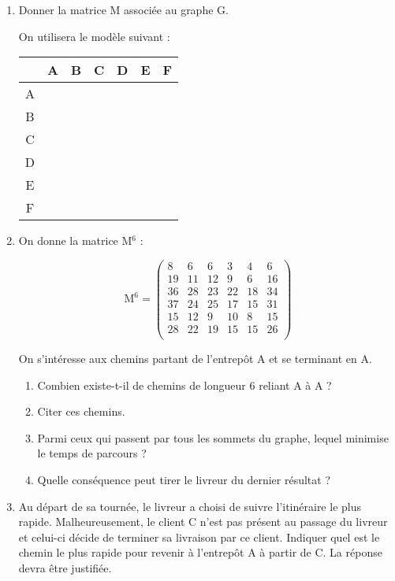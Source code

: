 \documentclass[]{prof}
\begin{document}
\begin{enumerate} 
\item Donner la matrice M associée au graphe G.

On utilisera le modèle suivant :

\begin{center}
    \begin{tabular}{|*{7}{c|}}\cline{2-7}
    \multicolumn{1}{c|}{}%
        & A & B & C & D & E & F \\ \hline
    A   &   &   &   &   &   &   \\ \hline
    B   &   &   &   &   &   &   \\ \hline
    C   &   &   &   &   &   &   \\ \hline
    D   &   &   &   &   &   &   \\ \hline
    E   &   &   &   &   &   &   \\ \hline
    F   &   &   &   &   &   &   \\ \hline
    \end{tabular}
\end{center}

\item  On donne la matrice M$^6$ :

\[\text{M}^6 = 
\begin{pmatrix}
    8   &   6   &   6   &   3   &   4   &   6 \\
    19  &   11  &   12  &   9   &   6   &   16\\
    36  &   28  &   23  &   22  &   18  &   34\\
    37  &   24  &   25  &   17  &   15  &   31\\
    15  &   12  &   9   &   10  &   8   &   15\\
    28  &   22  &   19  &   15  &   15  &   26\\
\end{pmatrix}\]

On s'intéresse aux chemins partant de l'entrepôt A et se terminant en A.

   \begin{enumerate} 
   \item Combien existe-t-il de chemins de longueur 6 reliant A à A ?
   \item Citer ces chemins.
   \item Parmi ceux qui passent par tous les sommets du graphe, lequel minimise le temps de parcours ?
   \item Quelle conséquence peut tirer le livreur du dernier résultat ?
   \end{enumerate}
\item Au départ de sa tournée, le livreur a choisi de suivre l'itinéraire le plus rapide. Malheureusement, le client C n'est pas présent au passage du livreur et celui-ci décide de terminer sa livraison par ce client. Indiquer  quel est le chemin le plus rapide pour revenir à l'entrepôt A à partir de C. La réponse devra être justifiée.
\end{enumerate}
\end{document}
